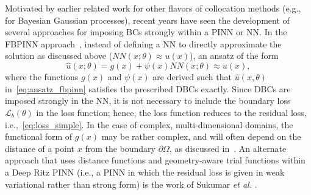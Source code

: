 \documentclass[oneside,final]{csri23}
\begin{document}
Motivated by earlier related work for other flavors of 
collocation methods (e.g., \cite{WDS:Graepel:2003} for Bayesian Gaussian processes), recent years have seen the development of several approaches for imposing BCs strongly within a PINN or NN.  In the FBPINN approach~\cite{WDS:Moseley:2023,WDS:Dolean:2023}, instead of defining a NN to directly approximate the solution as discussed above ($NN(x;\theta) \approx u(x)$), an ansatz of the form
\begin{equation} \label{eq:ansatz_fbpinn}
    \hat{u}(x; \theta) = g(x) + \psi(x) NN(x; \theta) \approx u(x),
\end{equation}
where the functions $g(x)$ and $\psi(x)$ are derived such that $\hat{u}(x,\theta)$ in~\eqref{eq:ansatz_fbpinn} satisfies the prescribed DBCs exactly. Since DBCs are imposed strongly in the NN, it is not necessary to include the boundary loss $\mathcal{L}_b(\theta)$ in the loss function; hence, the loss function reduces to the residual loss, i.e.,~\eqref{eq:loss_simple}. In the case of complex, multi-dimensional domains, the functional form of $g(x)$ may be rather complex, and will often depend on the distance of a point $x$ from the boundary $\partial \Omega$, as discussed in~\cite{WDS:Wang:2022}. An alternate approach that uses distance functions and geometry-aware trial functions within a Deep Ritz PINN (i.e., a PINN in which the residual loss is given in weak variational rather than strong form) is the work of Sukumar \textit{et al.} \cite{WDS:Sukumar:2022}.
\end{document}
